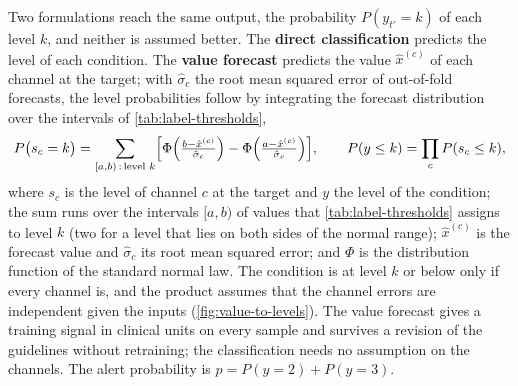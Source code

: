 \documentclass[11pt,a4paper,oneside]{report}
\begin{document}
Two formulations reach the same output, the probability $P(y_{t'} = k)$ of each level $k$, and neither is assumed better. The \textbf{direct classification} predicts the level of each condition. The \textbf{value forecast} predicts the value $\hat{x}^{(c)}$ of each channel at the target; with $\hat\sigma_c$ the root mean squared error of out-of-fold forecasts, the level probabilities follow by integrating the forecast distribution over the intervals of \cref{tab:label-thresholds},
\begin{equation}
  P\bigl(s_c = k\bigr) = \sum_{[a,b)\,:\,\text{level } k} \Bigl[\Phi\Bigl(\tfrac{b - \hat{x}^{(c)}}{\hat\sigma_c}\Bigr) - \Phi\Bigl(\tfrac{a - \hat{x}^{(c)}}{\hat\sigma_c}\Bigr)\Bigr],
  \qquad P(y \leq k) = \prod_c P(s_c \leq k),
\end{equation}
where $s_c$ is the level of channel $c$ at the target and $y$ the level of the condition; the sum runs over the intervals $[a,b)$ of values that \cref{tab:label-thresholds} assigns to level $k$ (two for a level that lies on both sides of the normal range); $\hat{x}^{(c)}$ is the forecast value and $\hat\sigma_c$ its root mean squared error; and $\Phi$ is the distribution function of the standard normal law. The condition is at level $k$ or below only if every channel is, and the product assumes that the channel errors are independent given the inputs (\cref{fig:value-to-levels}). The value forecast gives a training signal in clinical units on every sample and survives a revision of the guidelines without retraining; the classification needs no assumption on the channels. The alert probability is $p = P(y = 2) + P(y = 3)$.
\end{document}
